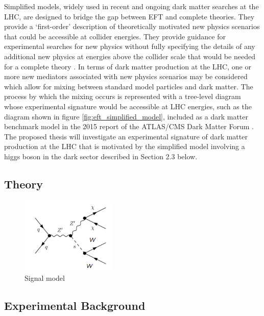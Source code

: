 \documentclass[12pt]{article}
\begin{document}
Simplified models, widely used in recent and ongoing dark matter searches at the LHC, are designed to bridge the gap between EFT and complete theories. They provide a `first-order' description of theoretically motivated new physics scenarios that could be accessible at collider energies. They provide guidance for experimental searches for new physics without fully specifying the details of any additional new physics at energies above the collider scale that would be needed for a complete theory \cite{DM_colliders}. In terms of dark matter production at the LHC, one or more new mediators associated with new physics scenarios may be considered which allow for mixing between standard model particles and dark matter. The process by which the mixing occurs is represented with a tree-level diagram whose experimental signature would be accessible at LHC energies, such as the diagram shown in figure \ref{fig:eft_simplified_model}, included as a dark matter benchmark model in the 2015 report of the ATLAS/CMS Dark Matter Forum \cite{dm_forum}. The proposed thesis will investigate an experimental signature of dark matter production at the LHC that is motivated by the simplified model involving a higgs boson in the dark sector described in Section 2.3 below. 

\subsection{Theory}

\begin{figure}[H]
	\centering
	\includegraphics[width=0.4\textwidth]{figures/Signal.png}
	\caption{Signal model}
	\label{fig:signal}
\end{figure}

\subsection{Experimental Background}
\end{document}
